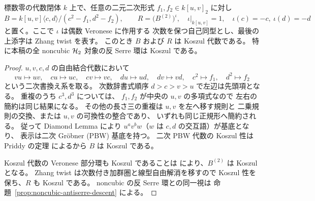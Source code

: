 \begin{proposition}
\label{prop:noncubic-antiserre-koszul}
標数零の代数閉体 $k$ 上で、任意の二元二次形式
$f_1,f_2\in k[u,v]_2$ に対し
\[
 B=k[u,v]\langle c,d\rangle/(c^2-f_1,d^2-f_2),
 \qquad
 R=\bigl(B^{(2)}\bigr)^\iota,\quad
 \iota|_{k[u,v]}=1,\quad \iota(c)=-c,\ \iota(d)=-d
\]
と置く。ここで $\iota$ は偶数 Veronese に作用する
次数を保つ自己同型とし、最後の上添字は Zhang twist を表す。
このとき $B$ および $R$ は Koszul 代数である。
特に本稿の全 noncubic $\mathcal H_2$ 対象の反 Serre 環は Koszul である。
\end{proposition}
\begin{proof}
$u,v,c,d$ の自由結合代数において
\[
 vu\mapsto uv,\quad
 cu\mapsto uc,\quad cv\mapsto vc,\quad
 du\mapsto ud,\quad dv\mapsto vd,\quad
 c^2\mapsto f_1,\quad d^2\mapsto f_2
\]
という二次書換え系を取る。
次数辞書式順序 $d>c>v>u$ で左辺は先頭項となる。
重複のうち $c^3,d^3$ については、
$f_1,f_2$ が中央の $u,v$ の多項式なので
左右の簡約は同じ結果になる。
その他の長さ三の重複は $u,v$ を左へ移す規則と
二乗規則の交換、または $u,v$ の可換性の整合であり、
いずれも同じ正規形へ簡約される。
従って Diamond Lemma により
$u^av^bw$（$w$ は $c,d$ の交互語）が基底となり、
表示は二次 Gröbner (PBW) 基底を持つ。
二次 PBW 代数の Koszul 性は
Priddy の定理
\cite[Chapter 4, Theorem 3.1]{PolishchukPositselski2005}
によるから $B$ は Koszul である。

Koszul 代数の Veronese 部分環も Koszul であることは
\cite[Chapter 3, Proposition 2.2(i)]{PolishchukPositselski2005}
により、$B^{(2)}$ は Koszul となる。
Zhang twist は次数付き加群圏と線型自由解消を移すので
Koszul 性を保ち、$R$ も Koszul である。
noncubic の反 Serre 環との同一視は
命題~\ref{prop:noncubic-antiserre-descent} による。
\end{proof}

